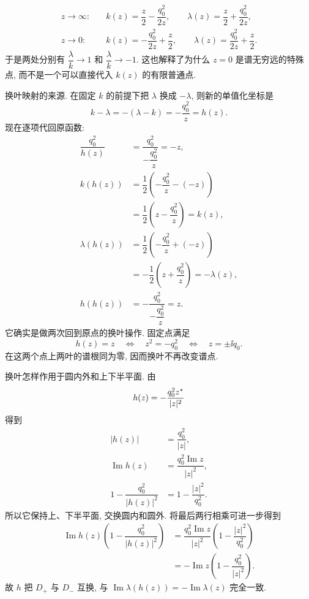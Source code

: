 \begin{align*}
z\to\infty:\quad
&k(z)=\dfrac{z}{2}-\dfrac{q_0^2}{2z},
\qquad
\lambda(z)=\dfrac{z}{2}+\dfrac{q_0^2}{2z},\\
z\to0:\quad
&k(z)=-\dfrac{q_0^2}{2z}+\dfrac{z}{2},
\qquad
\lambda(z)=\dfrac{q_0^2}{2z}+\dfrac{z}{2}.
\end{align*}
于是两处分别有 $\dfrac{\lambda}{k}\to1$ 和 $\dfrac{\lambda}{k}\to-1$. 这也解释了为什么 $z=0$ 是谱无穷远的特殊点, 而不是一个可以直接代入 $k(z)$ 的有限普通点.
\par\smallskip\noindent 换叶映射的来源.\quad
在固定 $k$ 的前提下把 $\lambda$ 换成 $-\lambda$, 则新的单值化坐标是
\begin{equation*}
k-\lambda=-(\lambda-k)=-\dfrac{q_0^2}{z}=h(z).
\end{equation*}
现在逐项代回原函数:
\begin{align*}
\dfrac{q_0^2}{h(z)}
&=\dfrac{q_0^2}{-\dfrac{q_0^2}{z}}=-z,\\
k(h(z))
&=\dfrac{1}{2}\left(-\dfrac{q_0^2}{z}-(-z)\right)\\
&=\dfrac{1}{2}\left(z-\dfrac{q_0^2}{z}\right)=k(z),\\
\lambda(h(z))
&=\dfrac{1}{2}\left(-\dfrac{q_0^2}{z}+(-z)\right)\\
&=-\dfrac{1}{2}\left(z+\dfrac{q_0^2}{z}\right)=-\lambda(z),\\
h(h(z))
&=-\dfrac{q_0^2}{-\dfrac{q_0^2}{z}}=z.
\end{align*}
它确实是做两次回到原点的换叶操作. 固定点满足
\begin{equation*}
h(z)=z
\quad\Longleftrightarrow\quad
z^2=-q_0^2
\quad\Longleftrightarrow\quad
z=\pm\ii q_0.
\end{equation*}
在这两个点上两叶的谱根同为零, 因而换叶不再改变谱点.
\par\smallskip\noindent 换叶怎样作用于圆内外和上下半平面.\quad
由
\begin{equation*}
h(z)=-\dfrac{q_0^2{z}^{*}}{|z|^2}
\end{equation*}
得到
\begin{align*}
|h(z)|&=\dfrac{q_0^2}{|z|},\\
\operatorname{Im}h(z)
&=\dfrac{q_0^2\operatorname{Im}z}{|z|^2},\\
1-\dfrac{q_0^2}{|h(z)|^2}
&=1-\dfrac{|z|^2}{q_0^2}.
\end{align*}
所以它保持上、下半平面, 交换圆内和圆外. 将最后两行相乘可进一步得到
\begin{align*}
\operatorname{Im}h(z)
\left(1-\dfrac{q_0^2}{|h(z)|^2}\right)
&=\dfrac{q_0^2\operatorname{Im}z}{|z|^2}
\left(1-\dfrac{|z|^2}{q_0^2}\right)\\
&=-\operatorname{Im}z
\left(1-\dfrac{q_0^2}{|z|^2}\right).
\end{align*}
故 $h$ 把 $D_+$ 与 $D_-$ 互换, 与 $\operatorname{Im}\lambda(h(z))=-\operatorname{Im}\lambda(z)$ 完全一致.

